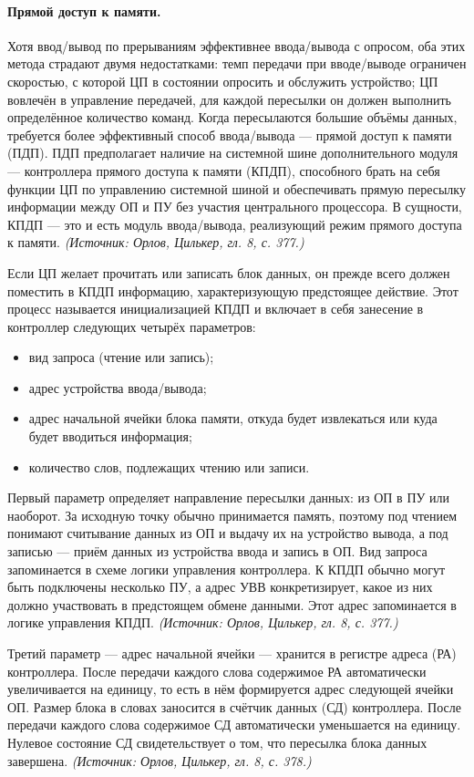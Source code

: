 \documentclass[a4paper,12pt]{article}
\begin{document}
\paragraph{Прямой доступ к памяти.}
Хотя ввод/вывод по прерываниям эффективнее ввода/вывода с опросом, оба этих метода страдают двумя недостатками: темп передачи при вводе/выводе ограничен скоростью, с которой ЦП в состоянии опросить и обслужить устройство; ЦП вовлечён в управление передачей, для каждой пересылки он должен выполнить определённое количество команд. Когда пересылаются большие объёмы данных, требуется более эффективный способ ввода/вывода — прямой доступ к памяти (ПДП). ПДП предполагает наличие на системной шине дополнительного модуля — контроллера прямого доступа к памяти (КПДП), способного брать на себя функции ЦП по управлению системной шиной и обеспечивать прямую пересылку информации между ОП и ПУ без участия центрального процессора. В сущности, КПДП — это и есть модуль ввода/вывода, реализующий режим прямого доступа к памяти.
\textit{(Источник: Орлов, Цилькер, гл. 8, с. 377.)}

Если ЦП желает прочитать или записать блок данных, он прежде всего должен поместить в КПДП информацию, характеризующую предстоящее действие. Этот процесс называется инициализацией КПДП и включает в себя занесение в контроллер следующих четырёх параметров:
\begin{itemize}
\item вид запроса (чтение или запись);
\item адрес устройства ввода/вывода;
\item адрес начальной ячейки блока памяти, откуда будет извлекаться или куда будет вводиться информация;
\item количество слов, подлежащих чтению или записи.
\end{itemize}
Первый параметр определяет направление пересылки данных: из ОП в ПУ или наоборот. За исходную точку обычно принимается память, поэтому под чтением понимают считывание данных из ОП и выдачу их на устройство вывода, а под записью — приём данных из устройства ввода и запись в ОП. Вид запроса запоминается в схеме логики управления контроллера. К КПДП обычно могут быть подключены несколько ПУ, а адрес УВВ конкретизирует, какое из них должно участвовать в предстоящем обмене данными. Этот адрес запоминается в логике управления КПДП.
\textit{(Источник: Орлов, Цилькер, гл. 8, с. 377.)}

Третий параметр — адрес начальной ячейки — хранится в регистре адреса (РА) контроллера. После передачи каждого слова содержимое РА автоматически увеличивается на единицу, то есть в нём формируется адрес следующей ячейки ОП. Размер блока в словах заносится в счётчик данных (СД) контроллера. После передачи каждого слова содержимое СД автоматически уменьшается на единицу. Нулевое состояние СД свидетельствует о том, что пересылка блока данных завершена.
\textit{(Источник: Орлов, Цилькер, гл. 8, с. 378.)}
\end{document}
